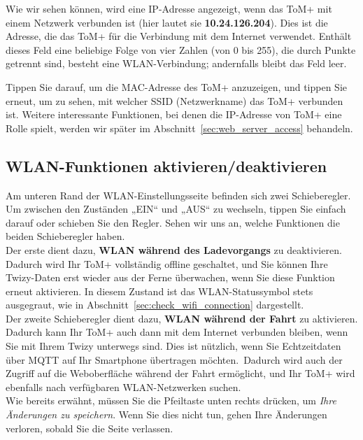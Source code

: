 Wie wir sehen können, wird eine IP-Adresse angezeigt, wenn das ToM+ mit einem Netzwerk verbunden ist
(hier lautet sie \textbf{10.24.126.204}). Dies ist die Adresse, die das ToM+ für die Verbindung
mit dem Internet verwendet. Enthält dieses Feld eine beliebige Folge von vier Zahlen (von 0 bis 255),
die durch Punkte getrennt sind, besteht eine WLAN-Verbindung; andernfalls bleibt das Feld leer. 

Tippen Sie darauf, um die MAC-Adresse des ToM+ anzuzeigen, und tippen Sie erneut, um zu sehen, mit welcher SSID (Netzwerkname) das ToM+ verbunden ist.
Weitere interessante Funktionen, bei denen die IP-Adresse von ToM+ eine Rolle spielt, werden wir später im Abschnitt~\ref{sec:web_server_access} behandeln.

\subsection{WLAN-Funktionen aktivieren/deaktivieren}
\label{sec:enable_disable_wifi}

Am unteren Rand der WLAN-Einstellungsseite befinden sich zwei Schieberegler. Um zwischen den
Zuständen „EIN“ und „AUS“ zu wechseln, tippen Sie einfach darauf oder schieben Sie den Regler. Sehen wir uns an, welche Funktionen die beiden Schieberegler haben.\\

Der erste dient dazu, \textbf{WLAN während des Ladevorgangs} zu deaktivieren. Dadurch wird Ihr ToM+ vollständig offline geschaltet,
und Sie können Ihre Twizy-Daten erst wieder aus der Ferne überwachen, wenn Sie diese Funktion erneut aktivieren.
In diesem Zustand ist das WLAN-Statussymbol stets ausgegraut, wie in Abschnitt~\ref{sec:check_wifi_connection} dargestellt.\\

Der zweite Schieberegler dient dazu, \textbf{WLAN während der Fahrt} zu aktivieren. Dadurch kann
Ihr ToM+ auch dann mit dem Internet verbunden bleiben, wenn Sie mit Ihrem Twizy unterwegs sind.
Dies ist nützlich, wenn Sie Echtzeitdaten über MQTT auf Ihr Smartphone übertragen möchten.~Dadurch
wird auch der Zugriff auf die Weboberfläche während der Fahrt ermöglicht, und Ihr ToM+ wird
ebenfalls nach verfügbaren WLAN-Netzwerken suchen.\\

Wie bereits erwähnt, müssen Sie die Pfeiltaste unten rechts drücken, um \textit{Ihre Änderungen zu speichern}.
Wenn Sie dies nicht tun, gehen Ihre Änderungen verloren, sobald Sie die Seite verlassen.

